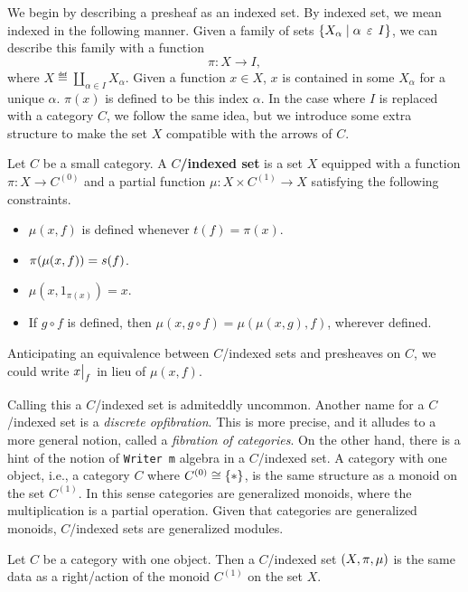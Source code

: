 \documentclass[../main.tex]{subfiles}
\begin{document}
We begin by describing a presheaf as an indexed set. By indexed set, we mean
indexed in the following manner. Given a family of sets \({\left\{ X_\alpha \mid
  \alpha \mathrel{\,\varepsilon\,} I \right\}}\), we can describe this family with a function
\[%
  \pi : X \to I,
\]%
where \(X \eqdef \coprod_{\alpha \in I} X_\alpha\). Given a function \(x \in
X\), \(x\) is contained in some \(X_\alpha\) for a unique \(\alpha\). \(\pi(x)\)
is defined to be this index \(\alpha\). In the case where \(I\) is replaced with
a category \(C\), we follow the same idea, but we introduce some extra structure
to make the set \(X\) compatible with the arrows of \(C\).
\begin{definition}
  Let \(C\) be a small category. A \textbf{\(C\)\-/indexed set} is a set \(X\)
  equipped with a function \(\pi : X \to C^{(0)}\) and a partial function
  \(\mu : X \times C^{(1)} \to X\) satisfying the following constraints.
  \begin{itemize}
  \item \(\mu(x,f)\) is defined whenever \(t(f) = \pi(x)\).
  \item \(\pi{\left(\mu(x,f)\right)} = s(f)\).
  \item \(\mu(x,1_{\pi(x)}) = x\).
  \item If \(g \circ f\) is defined, then \(\mu(x,g\circ f) =
    \mu(\mu(x,g),f)\), wherever defined.
  \end{itemize}
  Anticipating an equivalence between \(C\)\-/indexed sets and presheaves on
  \(C\), we could write \(\restr{x}{f}\) in lieu of \(\mu(x,f)\).
\end{definition}
Calling this a \(C\)\-/indexed set is admiteddly uncommon. Another name for a
\(C\)\-/indexed set is a \emph{discrete opfibration}. This is more precise, and
it alludes to a more general notion, called a \emph{fibration of categories}. On
the other hand, there is a hint of the notion of \texttt{Writer m} algebra in a
\(C\)\-/indexed set. A category with one object, i.e., a category \(C\) where
\(C^{(0)} \cong {\left\{\ast\right\}}\), is the same structure as a monoid on the set
\(C^{(1)}\). In this sense categories are generalized monoids, where the
multiplication is a partial operation. Given that categories are generalized
monoids, \(C\)\-/indexed sets are generalized modules.
\begin{proposition}
  Let \(C\) be a category with one object. Then a \(C\)\-/indexed set
  \({\left(X,\pi,\mu\right)}\) is the same data as a right\-/action of the monoid
  \(C^{(1)}\) on the set \(X\).
\end{proposition}
\end{document}
